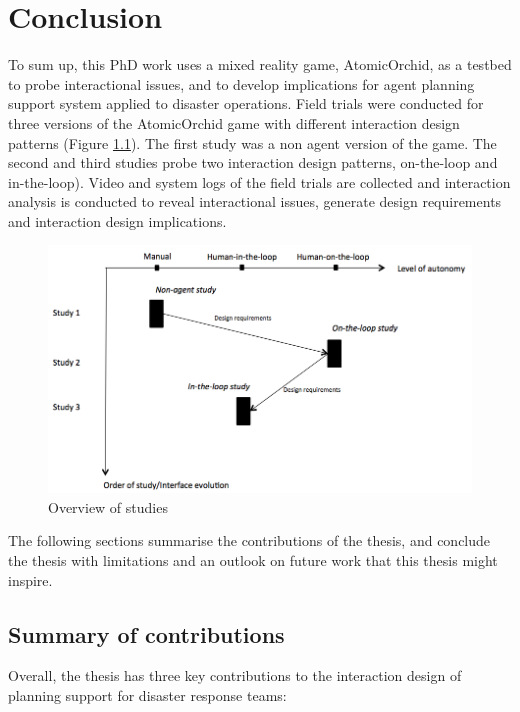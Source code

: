 \chapter{Conclusion}\label{ch:conclusion}
To sum up, this PhD work uses a mixed reality game, AtomicOrchid, as a testbed to probe interactional issues, and to develop implications for agent planning support system applied to disaster operations. Field trials were conducted for three versions of the AtomicOrchid game with different interaction design patterns (Figure \ref{fig:connections}). The first study was a non agent version of the game. The second and third studies probe two interaction design patterns, on-the-loop and in-the-loop). Video and system logs of the field trials are collected and interaction analysis is conducted to reveal interactional issues, generate design requirements and interaction design implications. \\

\begin{figure}[H]
  \centering
  \includegraphics[width=1\textwidth]{img/conclusion/studies}
  \caption{Overview of studies}
  \label{fig:connections}
\end{figure}

The following sections summarise the contributions of the thesis, and conclude the thesis with limitations and an outlook on future work that this thesis might inspire.\\


\section{Summary of contributions}
Overall, the thesis has three key contributions to the interaction design of planning support for disaster response teams:\\


